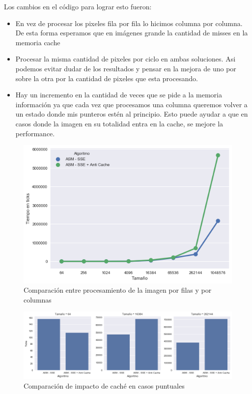 Los cambios en el código para lograr esto fueron:

\begin{itemize}
	\item En vez de procesar los pixeles fila por fila lo hicimos columna por columna. De esta forma esperamos que en imágenes grande la cantidad de misses en la memoria cache 

	\item Procesar la misma cantidad de pixeles por ciclo en ambas soluciones. Asi podemos evitar dudar de los resultados y pensar en la mejora de uno por sobre la otra por la cantidad de pixeles que esta procesando.

	\item Hay un incremento en la cantidad de veces que se pide a la memoria información ya que cada vez que procesamos una columna queremos volver a un estado donde mis punteros estén al principio. Esto puede ayudar a que en casos donde la imagen en su totalidad entra en la cache, se mejore la performance. 
\end{itemize}

\begin{figure}[H]
	\centering
	\includegraphics[scale=0.5]{img/fourCombine_antiCache.png}
	\caption{Comparación entre procesamiento de la imagen por filas y por columnas}
	\label{fourCombine_antiCache}
\end{figure}

\begin{figure}[H]
	\centering
	\includegraphics[scale=0.5]{img/fourCombine_antiCache_bars.png}
	\caption{Comparación de impacto de caché en casos puntuales}
	\label{fourCombine_antiCache_bars}
\end{figure}

